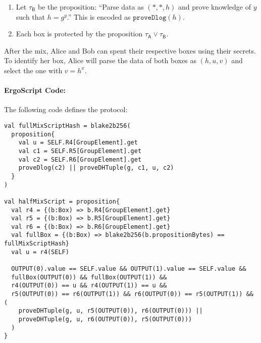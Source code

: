 \documentclass[11pt]{article}
\newcommand{\langname}{ErgoScript\xspace}
\newcommand{\mixname}{ErgoMix\xspace}
\begin{document}
\begin{enumerate}
\begin{enumerate}
		\item Let $\tau_{\textsf{B}}$ be the proposition: ``Parse data as $(*, *, h)$ and
		prove knowledge of $y$ such that $h = {g}^{y}$.'' This is encoded as $\texttt{proveDlog}(h)$.
		
		\item Each box is protected by the proposition $\tau_\textsf{A} \lor \tau_\textsf{B}$. 
		
	\end{enumerate}

\end{enumerate}
	After the mix, Alice and Bob can spent their respective boxes using their secrets. 
	To identify her box, Alice will parse the data of both boxes as $(h, u, v)$ and select the one with $v = h^x$. 

\paragraph{\langname Code:} The following code defines the protocol:
\begin{verbatim}
val fullMixScriptHash = blake2b256(
  proposition{
    val u = SELF.R4[GroupElement].get
    val c1 = SELF.R5[GroupElement].get
    val c2 = SELF.R6[GroupElement].get
    proveDlog(c2) || proveDHTuple(g, c1, u, c2)
  }
)

val halfMixScript = proposition{
  val r4 = {(b:Box) => b.R4[GroupElement].get}
  val r5 = {(b:Box) => b.R5[GroupElement].get}
  val r6 = {(b:Box) => b.R6[GroupElement].get}
  val fullBox = {(b:Box) => blake2b256(b.propositionBytes) == fullMixScriptHash}
  val u = r4(SELF)
  
  OUTPUT(0).value == SELF.value && OUTPUT(1).value == SELF.value && 
  fullBox(OUTPUT(0)) && fullBox(OUTPUT(1)) && 
  r4(OUTPUT(0)) == u && r4(OUTPUT(1)) == u && 
  r5(OUTPUT(0)) == r6(OUTPUT(1)) && r6(OUTPUT(0)) == r5(OUTPUT(1)) && (
    proveDHTuple(g, u, r5(OUTPUT(0)), r6(OUTPUT(0))) || 
    proveDHTuple(g, u, r6(OUTPUT(0)), r5(OUTPUT(0)))
  )
}
\end{verbatim}
\end{document}
